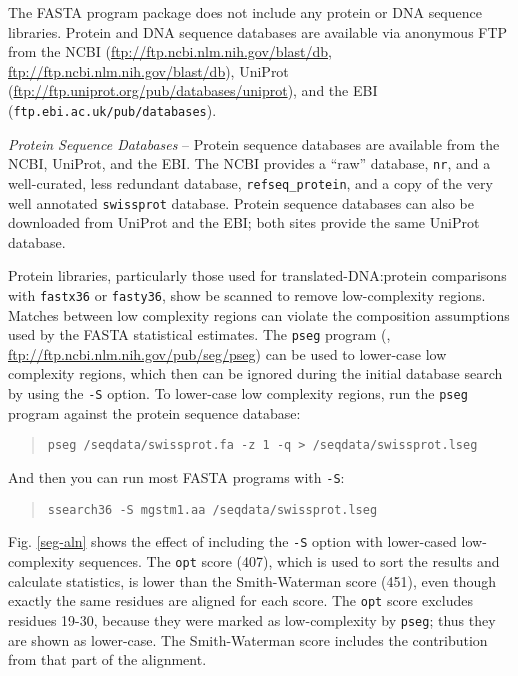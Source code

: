\documentclass[11pt]{article}
\begin{document}
The FASTA program package does not include any protein or DNA sequence
libraries.  Protein and DNA sequence databases are available via
anonymous FTP from the NCBI (\url{ftp://ftp.ncbi.nlm.nih.gov/blast/db},
\url{ftp://ftp.ncbi.nlm.nih.gov/blast/db}), UniProt
(\url{ftp://ftp.uniprot.org/pub/databases/uniprot}), and the EBI
(\texttt{ftp.ebi.ac.uk/pub/databases}).

\emph{Protein Sequence Databases} -- Protein sequence databases are
available from the NCBI, UniProt, and the EBI.  The NCBI provides a
``raw'' database, \texttt{nr}, and a well-curated, less redundant
database, \texttt{refseq\_protein}, and a copy of the very well
annotated \texttt{swissprot} database. Protein sequence databases can
also be downloaded from UniProt and the EBI; both sites provide the
same UniProt\cite{uniprot11} database.

Protein libraries, particularly those used for translated-DNA:protein
comparisons with \texttt{fastx36} or \texttt{fasty36}, show be scanned
to remove low-complexity regions.  Matches between low complexity
regions can violate the composition assumptions used by the FASTA
statistical estimates. The \texttt{pseg} program (\cite{woo935},
\url{ftp://ftp.ncbi.nlm.nih.gov/pub/seg/pseg}) can be used to lower-case
low complexity regions, which then can be ignored during the initial
database search by using the \texttt{-S} option.  To lower-case low
complexity regions, run the \texttt{pseg} program against the protein sequence database:
\begin{quote}
\begin{verbatim}
pseg /seqdata/swissprot.fa -z 1 -q > /seqdata/swissprot.lseg
\end{verbatim}
\end{quote}
And then you can run most FASTA programs with \texttt{-S}:
\begin{quote}
\begin{verbatim}
ssearch36 -S mgstm1.aa /seqdata/swissprot.lseg
\end{verbatim}
\end{quote}

Fig. \ref{seg-aln} shows the effect of including the \texttt{-S}
option with lower-cased low-complexity sequences.  The \texttt{opt}
score (407), which is used to sort the results and calculate
statistics, is lower than the Smith-Waterman score (451), even though
exactly the same residues are aligned for each score. The \texttt{opt}
score excludes residues 19-30, because they were marked as
low-complexity by \texttt{pseg}; thus they are shown as lower-case.
The Smith-Waterman score includes the contribution from that part of
the alignment.
\end{document}
